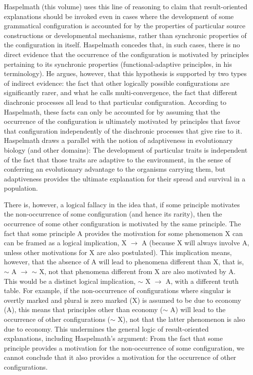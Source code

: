 \documentclass[output=paper]{langsci/langscibook}
\begin{document}
Haspelmath (this volume) uses this line of reasoning to claim that
result-oriented explanations  should be invoked even in cases where
the development of some grammatical configuration is accounted
for by the properties of particular source constructions or developmental
mechanisms, rather than synchronic properties of the configuration in itself.  Haspelmath concedes that, in such cases,
there is no direct evidence that the occurrence of the
configuration is motivated by principles pertaining to its synchronic
properties (functional-adaptive principles, in his terminology). He argues, however, that this
hypothesis is supported by two types of indirect evidence: the fact
that other logically possible configurations are significantly rarer, and what he calls
multi-convergence, the fact that different  diachronic processes all
lead to that particular configuration. According to Haspelmath, these facts
can only be accounted for by assuming that the occurrence of
the configuration is ultimately motivated by
principles that favor that configuration independently of the
diachronic processes that give rise to it.
 Haspelmath draws a parallel with the notion
of adaptiveness in evolutionary biology (and other domains):
The development of particular traits is independent of the fact that
those traits are adaptive to the environment, in the sense of conferring an evolutionary advantage to the organisms
carrying them, but adaptiveness provides the ultimate explanation for their
spread and survival in a population.

There is, however, a logical fallacy in the idea that, if some
 principle motivates the  non-occurrence of some
configuration (and hence its rarity),
then the occurrence of some other configuration is motivated by the
same principle. The fact that some principle A provides the motivation
for some phenomenon X can can be framed as a logical implication,  X
$\rightarrow$ A (because X will always involve A, unless other
motivations for X are also postulated).  This
implication means, however, that the absence of A will lead to phenomena different
than X, that is, $\sim$ A $\rightarrow$ $\sim$ X, not that phenomena
different from X are also motivated by A. This would be a distinct logical
implication, $\sim$ X $\rightarrow$ A, with a different truth table.
For example, if the non-occurrence
of configurations where singular is
overtly marked and plural is zero marked (X)  is assumed to be due to
economy (A), this means that principles other than economy ($\sim$ A) will lead to the occurrence of other configurations ($\sim$ X), not that
the latter phenomenon is also due to economy. This undermines the general
logic of result-oriented explanations, including Haspelmath's
argument: From the fact that some principle provides 
a motivation for the non-occurrence of some
configuration, we cannot conclude that it also provides a
motivation for the occurrence of other configurations.
\end{document}
